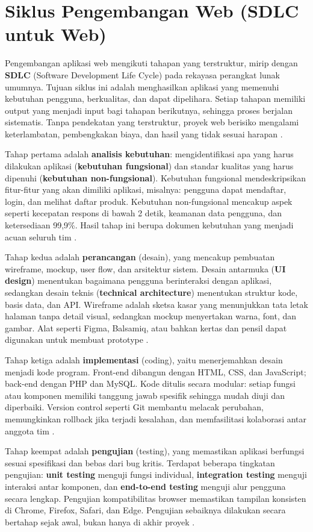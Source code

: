 \section{Siklus Pengembangan Web (SDLC untuk Web)}
Pengembangan aplikasi web mengikuti tahapan yang terstruktur, mirip dengan \textbf{SDLC} (Software Development Life Cycle) pada rekayasa perangkat lunak umumnya. Tujuan siklus ini adalah menghasilkan aplikasi yang memenuhi kebutuhan pengguna, berkualitas, dan dapat dipelihara. Setiap tahapan memiliki output yang menjadi input bagi tahapan berikutnya, sehingga proses berjalan sistematis. Tanpa pendekatan yang terstruktur, proyek web berisiko mengalami keterlambatan, pembengkakan biaya, dan hasil yang tidak sesuai harapan \cite{mdnLearn}.

Tahap pertama adalah \textbf{analisis kebutuhan}: mengidentifikasi apa yang harus dilakukan aplikasi (\textbf{kebutuhan fungsional}) dan standar kualitas yang harus dipenuhi (\textbf{kebutuhan non-fungsional}). Kebutuhan fungsional mendeskripsikan fitur-fitur yang akan dimiliki aplikasi, misalnya: pengguna dapat mendaftar, login, dan melihat daftar produk. Kebutuhan non-fungsional mencakup aspek seperti kecepatan respons di bawah 2 detik, keamanan data pengguna, dan ketersediaan 99,9\%. Hasil tahap ini berupa dokumen kebutuhan yang menjadi acuan seluruh tim \cite{webdevLearn}.

Tahap kedua adalah \textbf{perancangan} (desain), yang mencakup pembuatan wireframe, mockup, user flow, dan arsitektur sistem. Desain antarmuka (\textbf{UI design}) menentukan bagaimana pengguna berinteraksi dengan aplikasi, sedangkan desain teknis (\textbf{technical architecture}) menentukan struktur kode, basis data, dan API. Wireframe adalah sketsa kasar yang menunjukkan tata letak halaman tanpa detail visual, sedangkan mockup menyertakan warna, font, dan gambar. Alat seperti Figma, Balsamiq, atau bahkan kertas dan pensil dapat digunakan untuk membuat prototype \cite{webdevAccessibility}.

Tahap ketiga adalah \textbf{implementasi} (coding), yaitu menerjemahkan desain menjadi kode program. Front-end dibangun dengan HTML, CSS, dan JavaScript; back-end dengan PHP dan MySQL. Kode ditulis secara modular: setiap fungsi atau komponen memiliki tanggung jawab spesifik sehingga mudah diuji dan diperbaiki. Version control seperti Git membantu melacak perubahan, memungkinkan rollback jika terjadi kesalahan, dan memfasilitasi kolaborasi antar anggota tim \cite{mdnLearn}.

Tahap keempat adalah \textbf{pengujian} (testing), yang memastikan aplikasi berfungsi sesuai spesifikasi dan bebas dari bug kritis. Terdapat beberapa tingkatan pengujian: \textbf{unit testing} menguji fungsi individual, \textbf{integration testing} menguji interaksi antar komponen, dan \textbf{end-to-end testing} menguji alur pengguna secara lengkap. Pengujian kompatibilitas browser memastikan tampilan konsisten di Chrome, Firefox, Safari, dan Edge. Pengujian sebaiknya dilakukan secara bertahap sejak awal, bukan hanya di akhir proyek \cite{mdnToolsTesting}.


